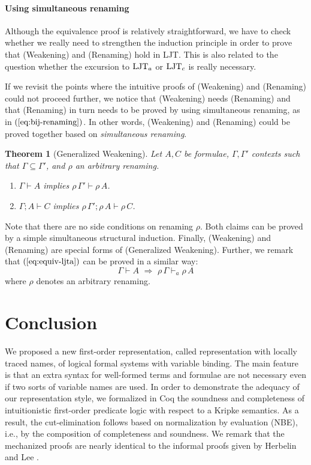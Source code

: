 \documentclass{svjour3}                     %
\newtheorem{thm}{Theorem}%
\newcommand{\Ga}{\Gamma}
\newcommand{\vd}{\vdash}
\newcommand{\tm}{\subseteq}
\newcommand{\scol}{\mathop{;}}
\newcommand{\ljt}{\textup{LJT}}
\newcommand{\vda}{\vdash_{\!\!\!a}}
\begin{document}
\paragraph{\bf Using simultaneous renaming}
Although the equivalence proof is relatively straightforward, we have to check whether we really need to strengthen the induction principle in order to prove that (Weakening) and (Renaming) hold in LJT. This is also related to the question whether the excursion to $\ljt_a$ or $\ljt_c$ is really necessary.

If we revisit the points where the intuitive proofs of (Weakening) and (Renaming) could not proceed further, we notice that (Weakening) needs (Renaming) and that (Renaming) in turn needs to be proved by using simultaneous renaming, as in $(\ref{eq:bij-renaming})$. In other words, (Weakening) and (Renaming) could be proved together based on \textit{simultaneous renaming}. 

\begin{thm}[Generalized Weakening]\label{gen-weakening}
    Let $A, C$ be formulae, $\Ga, \Ga'$ contexts such that $\Ga \tm \Ga'$, and $\rho$ an arbitrary renaming.
  \begin{enumerate}
  \item $\Ga \vd A$ implies $\rho\, \Ga' \vd \rho\, A$.
  \item $\Ga \scol A \vd C$ implies $\rho\, \Ga' \scol \rho\, A \vd \rho\, C$.
  \end{enumerate}
\end{thm}
Note that there are no side conditions on renaming $\rho$. Both claims can be proved by a simple simultaneous structural induction. Finally, (Weakening) and (Renaming) are special forms of (Generalized Weakening).
Further, we remark that $(\ref{eq:equiv-ljta})$ can be proved in a similar way:
\begin{equation*}
  \label{eq:equiv-ljta1}
  \Ga \vd A \,\,\Rightarrow\,\, \rho\, \Ga \vda \rho\, A  
\end{equation*}
where $\rho$ denotes an arbitrary renaming.

\section{Conclusion}\label{sec:conclusion}
We proposed a new first-order representation, called representation with locally traced names, of logical formal systems with variable binding. 
The main feature is that an extra syntax for well-formed terms and formulae are not necessary even if two sorts of variable names are used.
In order to demonstrate the adequacy of our representation style, we formalized in Coq the soundness and completeness of intuitionistic first-order predicate logic with respect to a Kripke semantics. As a result, the cut-elimination follows based on normalization by evaluation (NBE), i.e., by the composition of completeness and soundness. We remark that the mechanized proofs are nearly identical to the informal proofs given by Herbelin and Lee \cite{wollic09}.
\end{document}
